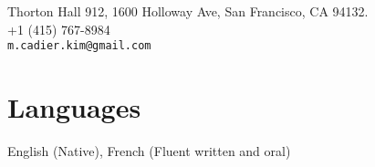 \documentclass[margin,line,pifont,palatino,courier]{res}
\begin{document}


\begin{resume}




\begin{flushright}
{\small
Thorton Hall 912, 1600 Holloway Ave, San Francisco, CA 94132. \\
+1 (415) 767-8984\\
  \verb+m.cadier.kim@gmail.com+
}
\end{flushright}



 















%





\section{\sc  Languages}
  English (Native), French (Fluent written and oral)



%

%

\end{resume}
\end{document}
